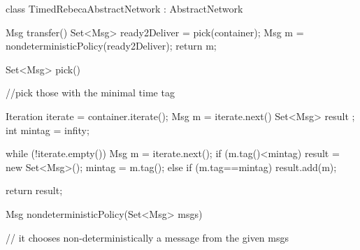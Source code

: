 class TimedRebecaAbstractNetwork : AbstractNetwork{
    
   
 
    Msg transfer() {
        Set<Msg> ready2Deliver = pick(container);
        Msg m = nondeterministicPolicy(ready2Deliver);
        return m;
    }
    
    Set<Msg> pick() {
        //pick those with the minimal time tag
        
        
        Iteration iterate = container.iterate();
        Msg m = iterate.next()
        Set<Msg> result ; 
        int mintag = infity;
        
        while (!iterate.empty()) {
            Msg m = iterate.next();
            if (m.tag()<mintag) {
                result = new Set<Msg>(); 
                mintag = m.tag();
             }else if (m.tag==mintag) result.add(m);
        }
        
        return result;
    }
    
    Msg nondeterministicPolicy(Set<Msg> msgs)
    {
        // it chooses non-deterministically a message from the given msgs

    }
    
}